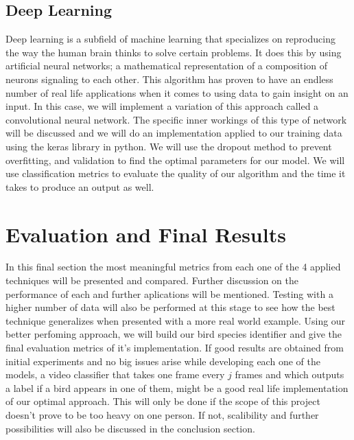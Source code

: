 \documentclass[11pt]{article}
\begin{document}
\begin{singlespace}
\subsection{Deep Learning}

Deep learning is a subfield of machine learning that specializes on reproducing the way the human brain thinks to solve certain problems. It does this by using artificial neural networks; a mathematical representation of a composition of neurons signaling to each other. This algorithm has proven to have an endless number of real life applications when it comes to using data to gain insight on an input. In this case, we will implement a variation of this approach called a convolutional neural network. The specific inner workings of this type of network will be discussed and we will do an implementation applied to our training data using the keras library in python. We will use the dropout method to prevent overfitting, and validation to find the optimal parameters for our model. We will use classification metrics to evaluate the quality of our algorithm and the time it takes to produce an output as well. 

\section{Evaluation and Final Results}

In this final section the most meaningful metrics from each one of the 4 applied techniques will be presented and compared. Further discussion on the performance of each and further aplications will be mentioned. Testing with a higher number of data will also be performed at this stage to see how the best technique generalizes when presented with a more real world example. Using our better perfoming approach, we will build our bird species identifier and give the final evaluation metrics of it's implementation. If good results are obtained from initial experiments and no big issues arise while developing each one of the models, a video classifier that takes one frame every $j$ frames and which outputs a label if a bird appears in one of them, might be a good real life implementation of our optimal approach. This will only be done if the scope of this project doesn't prove to be too heavy on one person. If not, scalibility and further possibilities will also be discussed in the conclusion section. 



\end{singlespace}
\end{document}

